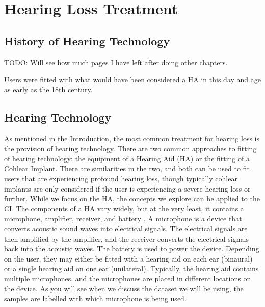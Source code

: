 \documentclass[logo,bsc,singlespacing,parskip,online]{infthesis}
\begin{document}
\section{Hearing Loss Treatment}

\subsection{History of Hearing Technology}
TODO: Will see how much pages I have left after doing other chapters.

Users were fitted with what would have been considered a HA in this day and age as early as the 18th century.


\subsection{Hearing Technology}
As mentioned in the Introduction, the most common treatment for hearing loss 
is the provision of hearing technology. There are two common approaches 
to fitting of hearing technology: the equipment of a Hearing Aid (HA) 
or the fitting of a Cohlear Implant. There are similarities in the 
two, and both can be used to fit users that are experiencing profound hearing loss, 
though typically cohlear implants are only considered if the user is experiencing 
a severe hearing loss or further. While we 
focus on the HA, the concepts we explore can be applied to the CI.
The components of a HA vary widely, but at the very least, 
it contains a microphone, amplifier, receiver, and battery \cite{schuster-bruce_conventional_2025}.
A microphone is a device that converts acoustic sound waves into electrical signals. 
The electrical signals are then amplified by the amplifier, and the receiver converts the electrical 
signals back into the acoustic waves. The battery is used to power the device. 
Depending on the user, they may either be fitted with a hearing aid on each 
ear (binaural) or a single hearing aid on one ear (unilateral). 
Typically, the hearing aid contains multiple microphones, and the microphones 
are placed in different locations on the device. As you will see when we discuss 
the dataset we will be using, the samples are labelled with which microphone 
is being used. 
\end{document}
